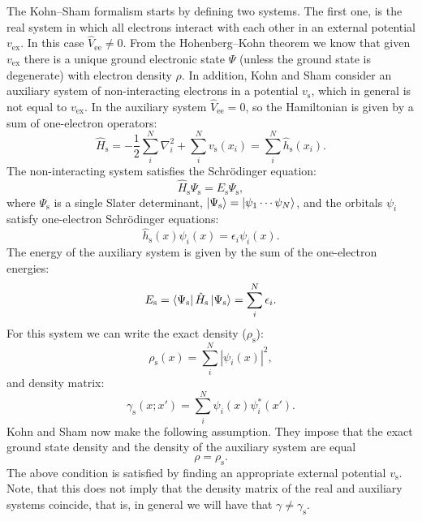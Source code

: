 \documentclass[../Main/chem532-notes.tex]{subfiles}
\begin{document}
The Kohn--Sham formalism starts by defining two systems.
The first one, is the real system in which all electrons interact with each other in an external potential $v_\mathrm{ex}$. In this case $\hat{V}_\mathrm{ee} \neq 0$.
From the Hohenberg--Kohn theorem we know that given $v_\mathrm{ex}$ there is a unique ground electronic state $\Psi$ (unless the ground state is degenerate) with electron density $\rho$.
In addition, Kohn and Sham consider an auxiliary system of non-interacting electrons in a potential $v_\mathrm{s}$, which in general is not equal to $v_\mathrm{ex}$.
In the auxiliary system $\hat{V}_\mathrm{ee} = 0$, so the Hamiltonian is given by a sum of one-electron operators:
\begin{equation}
\hat{H}_\mathrm{s} = -\frac{1}{2} \sum_i^N \nabla_i^2 + \sum_i^N v_\mathrm{s}(x_i) = \sum_i^N \hat{h}_\mathrm{s}(x_i).
\end{equation}
The non-interacting system satisfies the Schr\"{o}dinger equation:
\begin{equation}
\hat{H}_\mathrm{s} \Psi_\mathrm{s} = E_\mathrm{s} \Psi_\mathrm{s},
\end{equation}
where $\Psi_\mathrm{s}$ is a single Slater determinant, $\ket{\Psi_\mathrm{s}} = \ket{\psi_1 \cdots \psi_N}$, and the orbitals $\psi_i$ satisfy one-electron Schr\"{o}dinger equations:
\begin{equation}
\hat{h}_\mathrm{s}(x) \psi_i(x) = \epsilon_i \psi_i(x).
\end{equation}
The energy of the auxiliary system is given by the sum of the one-electron energies:
\begin{equation}
E_\mathrm{s} = \bra{\Psi_\mathrm{s}} \hat{H}_\mathrm{s} \ket{\Psi_\mathrm{s}} = \sum_i^N \epsilon_i.
\end{equation}
For this system we can write the exact density ($\rho_\mathrm{s}$):
\begin{equation}
\rho_\mathrm{s}(x) = \sum_i^N |\psi_i(x)|^2,
\end{equation}
and density matrix:
\begin{equation}
\gamma_\mathrm{s}(x;x') = \sum_i^N \psi_i(x) \psi_i^*(x').
\end{equation}
Kohn and Sham now make the following assumption.
They impose that the exact ground state density and the density of the auxiliary system are equal
\begin{equation}
\rho = \rho_\mathrm{s}.
\end{equation}
The above condition is satisfied by finding an appropriate external potential $v_\mathrm{s}$.
Note, that this does not imply that the density matrix of the real and auxiliary systems coincide, that is, in general we will have that $\gamma \neq \gamma_\mathrm{s}$.
\end{document}

